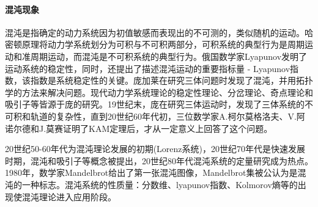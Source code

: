         \paragraph{混沌现象}混沌是指确定的动力系统因为初值敏感而表现出的不可测的，类似随机的运动。哈密顿原理将动力学系统划分为可积与不可积两部分，可积系统的典型行为是周期运动和准周期运动，而混沌是不可积系统的典型行为。俄国数学家Lyapunov发明了运动系统的稳定性，同时，还提出了描述混沌运动的重要指标量 - Lyapunov指数，该指数是系统稳定性的关键。庞加莱在研究三体问题时发现了混沌，并用拓扑学的方法来解决问题。现代动力学系统理论的稳定性理论、分岔理论、奇点理论和吸引子等皆源于庞的研究。19世纪末，庞在研究三体运动时，发现了三体系统的不可积和轨道的复杂性，直到20世纪60年代初，三位数学家A.柯尔莫格洛夫、V.阿诺尔德和J.莫赛证明了KAM定理后，才从一定意义上回答了这个问题。
        \par
        20世纪50-60年代为混沌理论发展的初期(Lorenz系统)，20世纪70年代是快速发展时期，混沌和吸引子等概念被提出，20世纪80年代混沌系统的定量研究成为热点。1980年，数学家Mandelbrot给出了第一张混沌图像，Mandelbrot集被公认为是混沌的一种标志。混沌系统的性质量：分数维、lyapunov指数、Kolmorov熵等的出现使混沌理论进入应用阶段。
